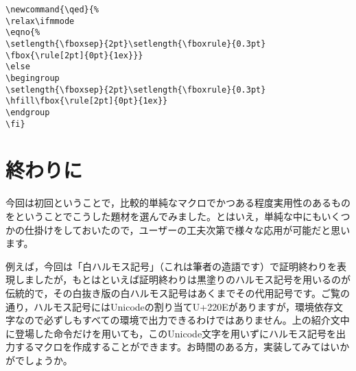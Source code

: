 \documentclass[autodetect-engine,dvipdfmx]{jsarticle}
\begin{document}
\begin{tcolorbox}

\begin{verbatim}
\newcommand{\qed}{%
\relax\ifmmode
\eqno{%
\setlength{\fboxsep}{2pt}\setlength{\fboxrule}{0.3pt}
\fbox{\rule[2pt]{0pt}{1ex}}}
\else
\begingroup
\setlength{\fboxsep}{2pt}\setlength{\fboxrule}{0.3pt}
\hfill\fbox{\rule[2pt]{0pt}{1ex}}
\endgroup
\fi}
\end{verbatim}

\end{tcolorbox}

\part{終わりに}

今回は初回ということで，比較的単純なマクロでかつある程度実用性のあるものをということでこうした題材を選んでみました。とはいえ，単純な中にもいくつかの仕掛けをしておいたので，ユーザーの工夫次第で様々な応用が可能だと思います。

例えば，今回は「白ハルモス記号」（これは筆者の造語です）で証明終わりを表現しましたが，もとはといえば証明終わりは黒塗りのハルモス記号を用いるのが伝統的で，その白抜き版の白ハルモス記号はあくまでその代用記号です。ご覧の通り，ハルモス記号にはUnicodeの割り当てU+220Eがありますが，環境依存文字なので必ずしもすべての環境で出力できるわけではありません。上の紹介文中に登場した命令だけを用いても，このUnicode文字を用いずにハルモス記号を出力するマクロを作成することができます。お時間のある方，実装してみてはいかがでしょうか。
\end{document}
